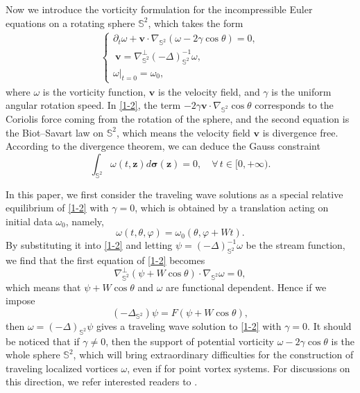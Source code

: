 \documentclass[12pt,reqno]{amsart}
\numberwithin{equation}{section}
\theoremstyle{definition}
\theoremstyle{remark}
\begin{document}
	Now we introduce the vorticity formulation for the incompressible Euler equations on a rotating sphere $\mathbb S^2$, which takes the form
	\begin{align}\label{1-2}
		\begin{cases}
			\partial_t\omega+\boldsymbol{v}\cdot \nabla_{\mathbb S^2} (\omega-2\gamma\cos\theta)=0,\\
			\ \boldsymbol{v}=\nabla^\perp_{\mathbb S^2}(-\Delta)^{-1}_{\mathbb S^2}\omega,\\
			\omega\big|_{t=0}=\omega_0,
		\end{cases}
	\end{align}
	where $\omega$ is the vorticity function, $\boldsymbol v$ is the velocity field, and $\gamma$ is the uniform angular rotation speed. In \eqref{1-2}, the term 
	$-2\gamma\boldsymbol v\cdot \nabla_{\mathbb S^2}\cos\theta$ corresponds to the Coriolis force coming from the rotation of the sphere, 
	and the second equation is the Biot--Savart law on $\mathbb S^2$, which means the velocity field $\boldsymbol v$ is divergence free.
	According to the divergence theorem, we can deduce the Gauss constraint 
	\begin{equation*}
		\int_{\mathbb S^2}\omega(t,\boldsymbol z)d\boldsymbol \sigma(\boldsymbol z)=0,\quad \forall \, t\in[0,+\infty).
	\end{equation*}
	
    In this paper, we first consider the traveling wave solutions as a special relative equilibrium of \eqref{1-2} with $\gamma=0$, 
    which is obtained by a translation acting on initial data $\omega_0$, namely, 
	\begin{equation*}
		\omega(t,\theta,\varphi)=\omega_0(\theta, \varphi+Wt).
	\end{equation*}
	By substituting it into \eqref{1-2} and letting $\psi=(-\Delta)^{-1}_{\mathbb S^2}\omega$ be the stream function, we find that the first equation of \eqref{1-2} becomes
	\begin{equation*}
		\nabla_{\mathbb{S}^2}^\perp(\psi+W\cos\theta)\cdot \nabla_{\mathbb S^2} \omega=0,
	\end{equation*}
	which means that $\psi+W\cos\theta$ and $\omega$ are functional dependent. Hence if we impose
	\begin{equation}\label{1-3}
		(-\Delta_{\mathbb S^2})\psi=F(\psi+W\cos\theta),
	\end{equation}
    then $\omega=(-\Delta)_{\mathbb{S}^2}\psi$ gives a traveling wave solution to \eqref{1-2} with $\gamma=0$. It should be noticed that if $\gamma\neq 0$, then the support of potential vorticity $\omega-2\gamma\cos\theta$ is the whole sphere $\mathbb S^2$, which will bring extraordinary difficulties for the construction of traveling localized vortices $\omega$, even if for point vortex systems. For discussions on this direction, we refer interested readers to \cite{New0}. 
    
\end{document}
